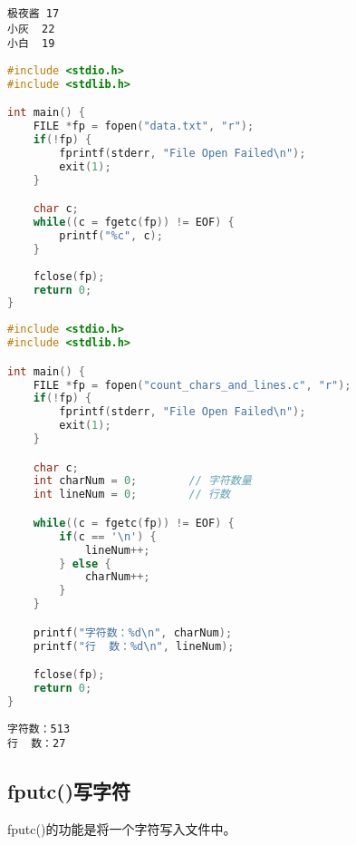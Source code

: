 \begin{lstlisting}[title=data.txt]
极夜酱	17
小灰	22
小白	19
\end{lstlisting}

\begin{lstlisting}[language=C, title=fgetc.c]
#include <stdio.h>
#include <stdlib.h>

int main() {
    FILE *fp = fopen("data.txt", "r");
    if(!fp) {
        fprintf(stderr, "File Open Failed\n");
        exit(1);
    }

    char c;
    while((c = fgetc(fp)) != EOF) {
        printf("%c", c);
    }
    
    fclose(fp);
    return 0;
}
\end{lstlisting}

\vspace{0.5cm}


\begin{lstlisting}[language=C, title=count\_chars\_and\_lines.c]
#include <stdio.h>
#include <stdlib.h>

int main() {
    FILE *fp = fopen("count_chars_and_lines.c", "r");
    if(!fp) {
        fprintf(stderr, "File Open Failed\n");
        exit(1);
    }

    char c;
    int charNum = 0;        // 字符数量
    int lineNum = 0;        // 行数

    while((c = fgetc(fp)) != EOF) {
        if(c == '\n') {
            lineNum++;
        } else {
            charNum++;
        }
    }

    printf("字符数：%d\n", charNum);
    printf("行  数：%d\n", lineNum);

    fclose(fp);
    return 0;
}
\end{lstlisting}

\begin{tcolorbox}
    \begin{verbatim}
字符数：513
行  数：27
	\end{verbatim}
\end{tcolorbox}

\vspace{0.5cm}

\subsection{fputc()写字符}

fputc()的功能是将一个字符写入文件中。\\

